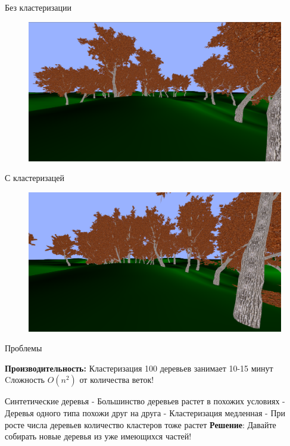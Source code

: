 \documentclass[11pt]{beamer}
\begin{document}
\begin{frame}{Без кластеризации}
\begin{figure}[hbtp]
\includegraphics[scale=0.18]{no_clust.png}
\end{figure}
\end{frame}
\begin{frame}{С кластеризацей}
\begin{figure}[hbtp]
\includegraphics[scale=0.18]{clust.png}
\end{figure}
\end{frame}
\begin{frame}{Проблемы}

\textbf{Производительность:}\linebreak
Кластеризация 100 деревьев занимает 10-15 минут\linebreak
Cложность $O(n^2)$ от количества веток!\linebreak

\end{frame}
\begin{frame}{Синтетические деревья}
- Большинство деревьев растет в похожих условиях\linebreak
- Деревья одного типа похожи друг на друга\linebreak
- Кластеризация медленная\linebreak
- При росте числа деревьев количество кластеров тоже растет\linebreak\linebreak
\textbf{Решение}:\linebreak
Давайте собирать новые деревья из уже имеющихся частей!	\linebreak																
\end{frame}
\end{document}
